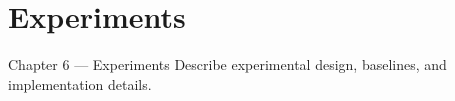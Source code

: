 \section{Experiments}

\begin{frame}{Chapter 6 — Experiments}
  Describe experimental design, baselines, and implementation details.
\end{frame}
